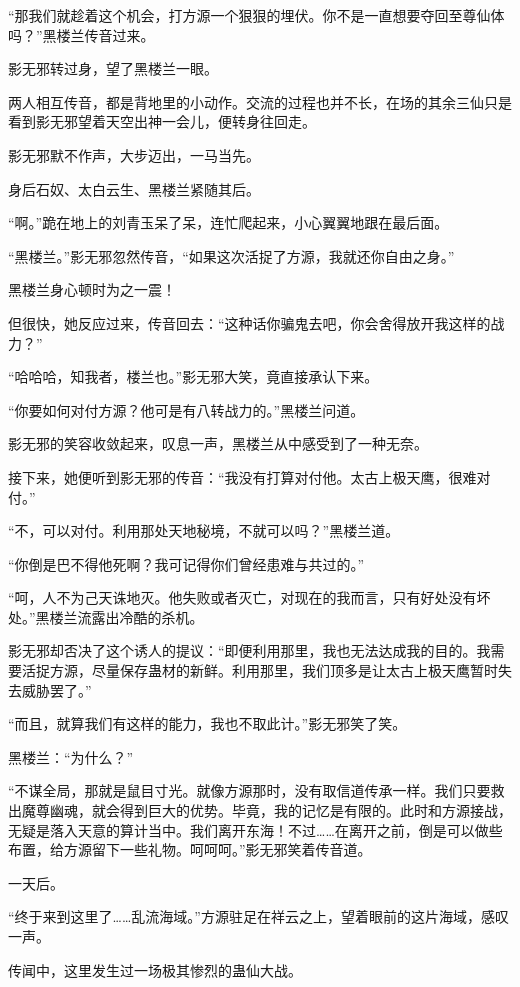 \begin{this_body}
“那我们就趁着这个机会，打方源一个狠狠的埋伏。你不是一直想要夺回至尊仙体吗？”黑楼兰传音过来。

影无邪转过身，望了黑楼兰一眼。

两人相互传音，都是背地里的小动作。交流的过程也并不长，在场的其余三仙只是看到影无邪望着天空出神一会儿，便转身往回走。

影无邪默不作声，大步迈出，一马当先。

身后石奴、太白云生、黑楼兰紧随其后。

“啊。”跪在地上的刘青玉呆了呆，连忙爬起来，小心翼翼地跟在最后面。

“黑楼兰。”影无邪忽然传音，“如果这次活捉了方源，我就还你自由之身。”

黑楼兰身心顿时为之一震！

但很快，她反应过来，传音回去：“这种话你骗鬼去吧，你会舍得放开我这样的战力？”

“哈哈哈，知我者，楼兰也。”影无邪大笑，竟直接承认下来。

“你要如何对付方源？他可是有八转战力的。”黑楼兰问道。

影无邪的笑容收敛起来，叹息一声，黑楼兰从中感受到了一种无奈。

接下来，她便听到影无邪的传音：“我没有打算对付他。太古上极天鹰，很难对付。”

“不，可以对付。利用那处天地秘境，不就可以吗？”黑楼兰道。

“你倒是巴不得他死啊？我可记得你们曾经患难与共过的。”

“呵，人不为己天诛地灭。他失败或者灭亡，对现在的我而言，只有好处没有坏处。”黑楼兰流露出冷酷的杀机。

影无邪却否决了这个诱人的提议：“即便利用那里，我也无法达成我的目的。我需要活捉方源，尽量保存蛊材的新鲜。利用那里，我们顶多是让太古上极天鹰暂时失去威胁罢了。”

“而且，就算我们有这样的能力，我也不取此计。”影无邪笑了笑。

黑楼兰：“为什么？”

“不谋全局，那就是鼠目寸光。就像方源那时，没有取信道传承一样。我们只要救出魔尊幽魂，就会得到巨大的优势。毕竟，我的记忆是有限的。此时和方源接战，无疑是落入天意的算计当中。我们离开东海！不过……在离开之前，倒是可以做些布置，给方源留下一些礼物。呵呵呵。”影无邪笑着传音道。

一天后。

“终于来到这里了……乱流海域。”方源驻足在祥云之上，望着眼前的这片海域，感叹一声。

传闻中，这里发生过一场极其惨烈的蛊仙大战。


\end{this_body}
